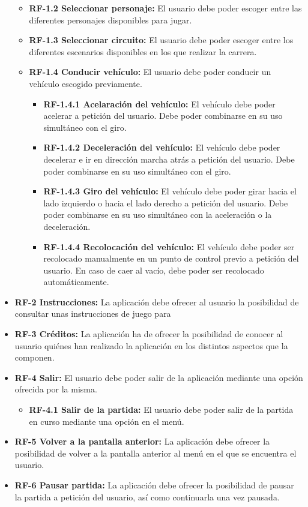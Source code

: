 \begin{itemize}
\begin{itemize}
\begin{itemize}
    	\end{itemize}
    	\item
    		\textbf{RF-1.2 Seleccionar personaje:} El usuario debe poder escoger entre las diferentes personajes disponibles para jugar.
		\item    	
    		\textbf{RF-1.3 Seleccionar circuito:} El usuario debe poder escoger entre los diferentes escenarios disponibles en los que realizar la carrera.
    	\item
    		\textbf{RF-1.4 Conducir vehículo:} El usuario debe poder conducir un vehículo escogido previamente.
    		\begin{itemize}
			\tightlist
				\item \textbf{RF-1.4.1 Acelaración del vehículo:} El vehículo debe poder acelerar a petición del usuario. Debe poder combinarse en su uso simultáneo con el giro.
				\item \textbf{RF-1.4.2 Deceleración del vehículo:} El vehículo debe poder decelerar e ir en dirección marcha atrás a petición del usuario. Debe poder combinarse en su uso simultáneo con el giro.
				\item \textbf{RF-1.4.3 Giro del vehículo:} El vehículo debe poder girar hacia el lado izquierdo o hacia el lado derecho a petición del usuario. Debe poder combinarse en su uso simultáneo con la aceleración o la deceleración.
				\item \textbf{RF-1.4.4 Recolocación del vehículo:} El vehículo debe poder ser recolocado manualmente en un punto de control previo a petición del usuario. En caso de caer al vacío, debe poder ser recolocado automáticamente.
			\end{itemize}
    \end{itemize}
    
	\item \textbf{RF-2 Instrucciones:} La aplicación debe ofrecer al usuario la posibilidad de consultar unas instrucciones de juego para 
	\item \textbf{RF-3 Créditos:} La aplicación ha de ofrecer la posibilidad de conocer al usuario quiénes han realizado la aplicación en los distintos aspectos que la componen.
	\item \textbf{RF-4 Salir:} El usuario debe poder salir de la aplicación mediante una opción ofrecida por la misma.
	\begin{itemize}
	\tightlist
		\item \textbf{RF-4.1 Salir de la partida:} El usuario debe poder salir de la partida en curso mediante una opción en el menú.
	\end{itemize}
	\item \textbf{RF-5 Volver a la pantalla anterior:} La aplicación debe ofrecer la posibilidad de volver a la pantalla anterior al menú en el que se encuentra el usuario.
	\item \textbf{RF-6 Pausar partida:} La aplicación debe ofrecer la posibilidad de pausar la partida a petición del usuario, así como continuarla una vez pausada.
\end{itemize}

